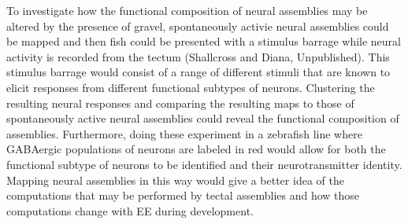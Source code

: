 To investigate how the functional composition of neural assemblies may be altered by the presence of gravel, spontaneously activie neural assemblies could be mapped and then fish could be presented with a stimulus barrage while neural activity is recorded from the tectum (Shallcross and Diana, Unpublished). This stimulus barrage would consist of a range of different stimuli that are	known to elicit	responses from different functional	subtypes of	neurons. Clustering the resulting neural responses and comparing the resulting maps to those of spontaneously active neural assemblies could reveal the functional composition of assemblies. Furthermore, doing these experiment in a zebrafish line where GABAergic populations of neurons are labeled in red would allow for both the functional subtype of neurons to be identified and their neurotransmitter identity. Mapping neural assemblies in this way would give a better idea of the computations that may be performed by tectal assemblies and how those computations change with EE during development.

